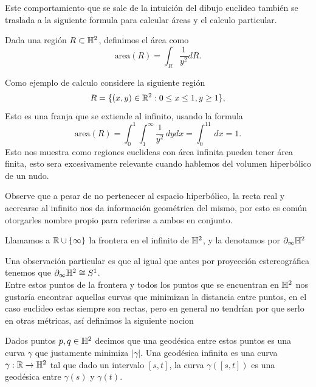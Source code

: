     Este comportamiento que se sale de la intuición del dibujo euclideo también se traslada a la siguiente formula para calcular áreas y el calculo particular.

    \begin{definition}
        Dada una región $R\subset \mathbb{H}^2$, definimos el área como
        $$\text{area}(R)=\int_R\frac{1}{y^2}dR.$$
    \end{definition}
    \begin{eg}
        Como ejemplo de calculo considere la siguiente región
         $$R=\{(x,y)\in \mathbb{R}^2: 0\leq x\leq 1,y\geq 1\},$$
         Esto es una franja que se extiende al infinito, usando la formula
         $$\text{area}(R)=\int_0^1\int_1^\infty\frac{1}{y^2}\,dydx=\int_0^11\,dx=1.$$
         Esto nos muestra como regiones euclideas con área infinita pueden tener área finita, esto sera excesivamente relevante cuando hablemos del volumen hiperbólico de un nudo.
    \end{eg}

    Observe que a pesar de no pertenecer al espacio hiperbólico, la recta real y acercarse al infinito nos da información geométrica del mismo, por esto es común otorgarles nombre propio para referirse a ambos en conjunto.

    \begin{definition}
        Llamamos a $\mathbb{R}\cup\{\infty\}$ la frontera en el infinito de $\mathbb{H}^2$, y la denotamos por $\partial_\infty\mathbb{H}^2$
    \end{definition}

    Una observación particular es que al igual que antes por proyección estereográfica tenemos que $\partial_\infty\mathbb{H}^2\cong S^1$.\\

    Entre estos puntos de la frontera y todos los puntos que se encuentran en $\mathbb{H}^2$ nos gustaría encontrar aquellas curvas que minimizan la distancia entre puntos, en el caso euclideo estas siempre son rectas, pero en general no tendrían por que serlo en otras métricas, así definimos la siguiente nocion
    \begin{definition}
        Dados puntos  $p,q\in\mathbb{H}^2$ decimos que una geodésica entre estos puntos es una curva $\gamma$ que justamente minimiza $|\gamma|$. Una geodésica infinita es una curva $\gamma:\mathbb{R}\to \mathbb{H}^2$ tal que dado un intervalo $[s,t]$, la curva $\gamma([s,t])$ es una geodésica entre $\gamma(s)$ y $\gamma(t).$
    \end{definition}

